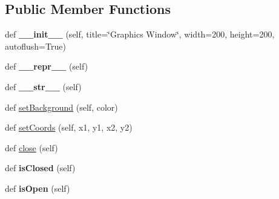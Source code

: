\subsection*{Public Member Functions}
\begin{DoxyCompactItemize}
\item 
def {\bfseries \+\_\+\+\_\+init\+\_\+\+\_\+} (self, title=\char`\"{}Graphics Window\char`\"{}, width=200, height=200, autoflush=True)\hypertarget{classgraphics_1_1_graph_win_abaf17e0a7d09fe97cbb23f03ca545339}{}\label{classgraphics_1_1_graph_win_abaf17e0a7d09fe97cbb23f03ca545339}

\item 
def {\bfseries \+\_\+\+\_\+repr\+\_\+\+\_\+} (self)\hypertarget{classgraphics_1_1_graph_win_afc6d29fa1772c46ec5f1c8917c0dfa36}{}\label{classgraphics_1_1_graph_win_afc6d29fa1772c46ec5f1c8917c0dfa36}

\item 
def {\bfseries \+\_\+\+\_\+str\+\_\+\+\_\+} (self)\hypertarget{classgraphics_1_1_graph_win_a47a25afdbc0a778241b364142caf862e}{}\label{classgraphics_1_1_graph_win_a47a25afdbc0a778241b364142caf862e}

\item 
def \hyperlink{classgraphics_1_1_graph_win_aec4e7921def91d795367eef63054a4df}{set\+Background} (self, color)
\item 
def \hyperlink{classgraphics_1_1_graph_win_a9f5ef08db39c026392b093c2d0a7fbe9}{set\+Coords} (self, x1, y1, x2, y2)
\item 
def \hyperlink{classgraphics_1_1_graph_win_a760daa823490308117c5ce3ea2946bfb}{close} (self)
\item 
def {\bfseries is\+Closed} (self)\hypertarget{classgraphics_1_1_graph_win_a77f97f64e8d3dddcef5d3c345ffedc6d}{}\label{classgraphics_1_1_graph_win_a77f97f64e8d3dddcef5d3c345ffedc6d}

\item 
def {\bfseries is\+Open} (self)\hypertarget{classgraphics_1_1_graph_win_a1a3732b58c2ffc8960be3a9f66bd4df8}{}\label{classgraphics_1_1_graph_win_a1a3732b58c2ffc8960be3a9f66bd4df8}


\end{DoxyCompactItemize}

